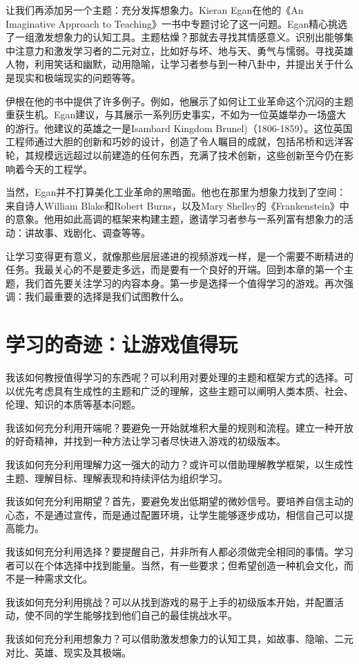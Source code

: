 让我们再添加另一个主题：充分发挥想象力。Kieran Egan在他的《An Imaginative Approach to Teaching》一书中专题讨论了这一问题。Egan精心挑选了一组激发想象力的认知工具。主题枯燥？那就去寻找其情感意义。识别出能够集中注意力和激发学习者的二元对立，比如好与坏、地与天、勇气与懦弱。寻找英雄人物，利用笑话和幽默，动用隐喻，让学习者参与到一种八卦中，并提出关于什么是现实和极端现实的问题等等。

伊根在他的书中提供了许多例子。例如，他展示了如何让工业革命这个沉闷的主题重获生机。Egan建议，与其展示一系列历史事实，不如为一位英雄举办一场盛大的游行。他建议的英雄之一是Isambard Kingdom Brunel)（1806-1859）。这位英国工程师通过大胆的创新和巧妙的设计，创造了令人瞩目的成就，包括吊桥和远洋客轮，其规模远远超过以前建造的任何东西，充满了技术创新，这些创新至今仍在影响着今天的工程学。

当然，Egan并不打算美化工业革命的黑暗面。他也在那里为想象力找到了空间：来自诗人William Blake和Robert Burns，以及Mary Shelley的《Frankenstein》中的意象。他用如此高调的框架来构建主题，邀请学习者参与一系列富有想象力的活动：讲故事、戏剧化、调查等等。

让学习变得更有意义，就像那些层层递进的视频游戏一样，是一个需要不断精进的任务。我最关心的不是要走多远，而是要有一个良好的开端。回到本章的第一个主题，我们首先要关注学习的内容本身。第一步是选择一个值得学习的游戏。再次强调：我们最重要的选择是我们试图教什么。

\section*{学习的奇迹：让游戏值得玩}

我该如何教授值得学习的东西呢？可以利用对要处理的主题和框架方式的选择。可以优先考虑具有生成性的主题和广泛的理解，这些主题可以阐明人类本质、社会、伦理、知识的本质等基本问题。

我该如何充分利用开端呢？要避免一开始就堆积大量的规则和流程。建立一种开放的好奇精神，并找到一种方法让学习者尽快进入游戏的初级版本。

我该如何充分利用理解力这一强大的动力？或许可以借助理解教学框架，以生成性主题、理解目标、理解表现和持续评估为组织学习。

我该如何充分利用期望？首先，要避免发出低期望的微妙信号。要培养自信主动的心态，不是通过宣传，而是通过配置环境，让学生能够逐步成功，相信自己可以提高能力。

我该如何充分利用选择？要提醒自己，并非所有人都必须做完全相同的事情。学习者可以在个体选择中找到能量。当然，有一些要求；但希望创造一种机会文化，而不是一种需求文化。

我该如何充分利用挑战？可以从找到游戏的易于上手的初级版本开始，并配置活动，使不同的学生能够找到他们自己的最佳挑战水平。

我该如何充分利用想象力？可以借助激发想象力的认知工具，如故事、隐喻、二元对比、英雄、现实及其极端。
